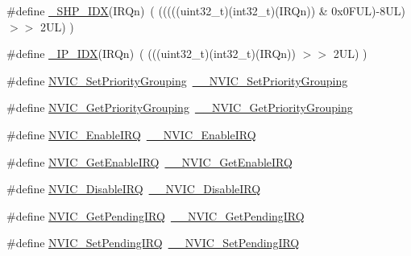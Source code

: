 \begin{DoxyCompactItemize}
\item 
\#define \hyperlink{group___c_m_s_i_s___core___n_v_i_c_functions_gaee4f7eb5d7e770ad51489dbceabb1755}{\+\_\+\+S\+H\+P\+\_\+\+I\+DX}(I\+R\+Qn)~( (((((uint32\+\_\+t)(int32\+\_\+t)(I\+R\+Qn)) \& 0x0\+F\+U\+L)-\/8\+U\+L) $>$$>$    2\+U\+L)      )
\item 
\#define \hyperlink{group___c_m_s_i_s___core___n_v_i_c_functions_ga370ec4b1751a6a889d849747df3763a9}{\+\_\+\+I\+P\+\_\+\+I\+DX}(I\+R\+Qn)~(   (((uint32\+\_\+t)(int32\+\_\+t)(I\+R\+Qn))                $>$$>$    2\+U\+L)      )
\item 
\#define \hyperlink{group___c_m_s_i_s___core___n_v_i_c_functions_ga0e798d5aec68cdd8263db86a76df788f}{N\+V\+I\+C\+\_\+\+Set\+Priority\+Grouping}~\hyperlink{group___c_m_s_i_s___core___n_v_i_c_functions_gafc94dcbaee03e4746ade1f5bb9aaa56d}{\+\_\+\+\_\+\+N\+V\+I\+C\+\_\+\+Set\+Priority\+Grouping}
\item 
\#define \hyperlink{group___c_m_s_i_s___core___n_v_i_c_functions_ga4eeb9214f2264fc23c34ad5de2d3fa11}{N\+V\+I\+C\+\_\+\+Get\+Priority\+Grouping}~\hyperlink{group___c_m_s_i_s___core___n_v_i_c_functions_ga9b894af672df4373eb637f8288845c05}{\+\_\+\+\_\+\+N\+V\+I\+C\+\_\+\+Get\+Priority\+Grouping}
\item 
\#define \hyperlink{group___c_m_s_i_s___core___n_v_i_c_functions_ga57b3064413dbc7459d9646020fdd8bef}{N\+V\+I\+C\+\_\+\+Enable\+I\+RQ}~\hyperlink{group___c_m_s_i_s___core___n_v_i_c_functions_ga71227e1376cde11eda03fcb62f1b33ea}{\+\_\+\+\_\+\+N\+V\+I\+C\+\_\+\+Enable\+I\+RQ}
\item 
\#define \hyperlink{group___c_m_s_i_s___core___n_v_i_c_functions_ga857de13232ec65dd15087eaa15bc4a69}{N\+V\+I\+C\+\_\+\+Get\+Enable\+I\+RQ}~\hyperlink{group___c_m_s_i_s___core___n_v_i_c_functions_gaaeb5e7cc0eaad4e2817272e7bf742083}{\+\_\+\+\_\+\+N\+V\+I\+C\+\_\+\+Get\+Enable\+I\+RQ}
\item 
\#define \hyperlink{group___c_m_s_i_s___core___n_v_i_c_functions_ga73b4e251f59cab4e9a5e234aac02ae57}{N\+V\+I\+C\+\_\+\+Disable\+I\+RQ}~\hyperlink{group___c_m_s_i_s___core___n_v_i_c_functions_gae016e4c1986312044ee768806537d52f}{\+\_\+\+\_\+\+N\+V\+I\+C\+\_\+\+Disable\+I\+RQ}
\item 
\#define \hyperlink{group___c_m_s_i_s___core___n_v_i_c_functions_gac608957a239466e9e0cbc30aa64feb3b}{N\+V\+I\+C\+\_\+\+Get\+Pending\+I\+RQ}~\hyperlink{group___c_m_s_i_s___core___n_v_i_c_functions_ga5a92ca5fa801ad7adb92be7257ab9694}{\+\_\+\+\_\+\+N\+V\+I\+C\+\_\+\+Get\+Pending\+I\+RQ}
\item 
\#define \hyperlink{group___c_m_s_i_s___core___n_v_i_c_functions_ga2b47e2e52cf5c48a5c3348636434b3ac}{N\+V\+I\+C\+\_\+\+Set\+Pending\+I\+RQ}~\hyperlink{group___c_m_s_i_s___core___n_v_i_c_functions_gaabefdd4b790b9a7308929938c0c1e1ad}{\+\_\+\+\_\+\+N\+V\+I\+C\+\_\+\+Set\+Pending\+I\+RQ}

\end{DoxyCompactItemize}
